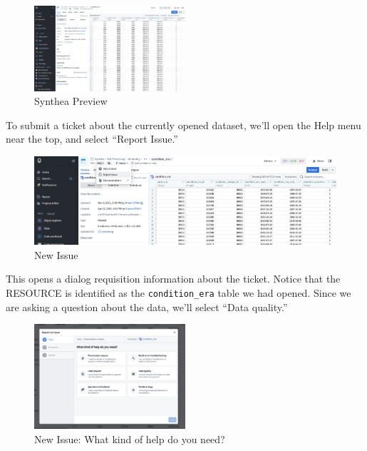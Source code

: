 \documentclass[
  letterpaper,
  DIV=11,
  numbers=noendperiod]{scrreprt}
\begin{document}
\begin{figure}

{\centering \includegraphics[width=0.5\textwidth,height=\textheight]{chapters/images/support/image-02-synthea-preview.png}

}

\caption{\label{fig-support-synthea-preview}Synthea Preview}

\end{figure}

To submit a ticket about the currently opened dataset, we'll open the
Help menu near the top, and select ``Report Issue.''

\begin{figure}

{\centering \includegraphics{chapters/images/support/image-03-issue-report.png}

}

\caption{\label{fig-support-issue-report}New Issue}

\end{figure}

This opens a dialog requisition information about the ticket. Notice
that the RESOURCE is identified as the \texttt{condition\_era} table we
had opened. Since we are asking a question about the data, we'll select
``Data quality.''

\begin{figure}

{\centering \includegraphics[width=0.5\textwidth,height=\textheight]{chapters/images/support/image-04-issue-kind-of-help.png}

}

\caption{\label{fig-support-issue-kind-of-help}New Issue: What kind of
help do you need?}

\end{figure}
\end{document}
